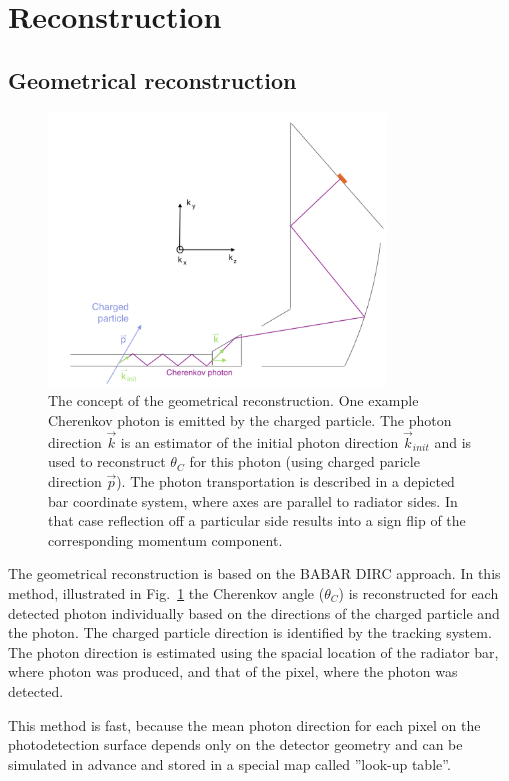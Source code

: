 \documentclass[11pt, a4paper]{article}
\begin{document}
\section{Reconstruction}
\subsection{Geometrical reconstruction}
\label{sec:gr}

\begin{figure}[!h]
\centering
\includegraphics[width=0.8\textwidth]{pics/lut3.png}
\caption{\label{pic:lut1}
The concept of the geometrical reconstruction. One example Cherenkov photon is emitted by the charged particle. The photon direction $\vec k$ is an estimator of the initial photon direction $\vec k_{init}$ and is used to reconstruct $\theta_{C}$ for this photon (using charged paricle direction $\vec p$). The photon transportation is described in a depicted bar coordinate system, where axes are parallel to radiator sides. In that case reflection off a particular side results into a sign flip of the corresponding momentum component.
}
\end{figure}

The geometrical reconstruction is based on the BABAR DIRC approach. In this method, illustrated in Fig.~\ref{pic:lut1} the Cherenkov angle ($\theta_{C}$) is reconstructed for each detected photon individually based on the directions of the charged particle and the photon. The charged particle direction is identified by the tracking system. The photon direction is estimated using the spacial location of the radiator bar, where photon was produced, and that of the pixel, where the photon was detected.

This method is fast, because the mean photon direction for each pixel on the photodetection surface depends only on the detector geometry and can be simulated in advance and stored in a special map called ''look-up table''.
\end{document}
